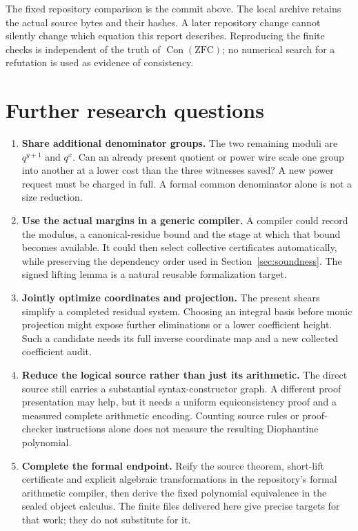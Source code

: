 \documentclass[10pt,letterpaper]{article}
\theoremstyle{definition}\newtheorem{definition}[theorem]{Definition}
\newcommand{\Con}{\operatorname{Con}}
\begin{document}


The fixed repository comparison is the commit above. The local archive
retains the actual source bytes and their hashes. A later repository change
cannot silently change which equation this report describes. Reproducing
the finite checks is independent of the truth of $\Con(\mathrm{ZFC})$;
no numerical search for a refutation is used as evidence of consistency.

\section{Further research questions}

\begin{enumerate}
\item \textbf{Share additional denominator groups.} The two remaining
moduli are $q^{y+1}$ and $q^x$. Can an already present quotient or power
wire scale one group into another at a lower cost than the three witnesses
saved? A new power request must be charged in full. A formal common
denominator alone is not a size reduction.
\item \textbf{Use the actual margins in a generic compiler.} A compiler
could record the modulus, a canonical-residue bound and the stage at which
that bound becomes available. It could then select collective certificates
automatically, while preserving the dependency order used in
Section~\ref{sec:soundness}. The signed lifting lemma is a natural reusable
formalization target.
\item \textbf{Jointly optimize coordinates and projection.} The present
shears simplify a completed residual system. Choosing an integral basis
before monic projection might expose further eliminations or a lower
coefficient height. Such a candidate needs its full inverse coordinate map
and a new collected coefficient audit.
\item \textbf{Reduce the logical source rather than just its arithmetic.}
The direct source still carries a substantial syntax-constructor graph.
A different proof presentation may help, but it needs a uniform
equiconsistency proof and a measured complete arithmetic encoding. Counting
source rules or proof-checker instructions alone does not measure the
resulting Diophantine polynomial.
\item \textbf{Complete the formal endpoint.} Reify the source theorem,
short-lift certificate and explicit algebraic transformations in the
repository's formal arithmetic compiler, then derive the fixed polynomial
equivalence in the sealed object calculus. The finite files delivered here
give precise targets for that work; they do not substitute for it.
\end{enumerate}
\end{document}

